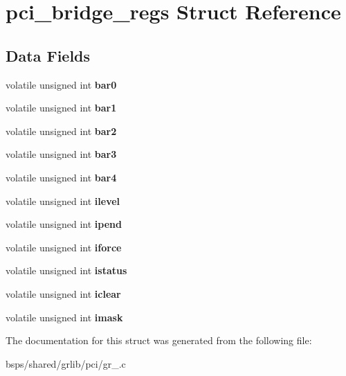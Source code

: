 \hypertarget{structpci__bridge__regs}{}\section{pci\+\_\+bridge\+\_\+regs Struct Reference}
\label{structpci__bridge__regs}
\subsection*{Data Fields}
\begin{DoxyCompactItemize}
\item 
\mbox{\label{structpci__bridge__regs_a6a49375f5d9adbc34e45adc59dcf5fa8}} 
volatile unsigned int {\bfseries bar0}
\item 
\mbox{\label{structpci__bridge__regs_ac6cdcee7ec727080a07e1de6ce5ab4d0}} 
volatile unsigned int {\bfseries bar1}
\item 
\mbox{\label{structpci__bridge__regs_a923411c8716ff44aa170d95dc853b584}} 
volatile unsigned int {\bfseries bar2}
\item 
\mbox{\label{structpci__bridge__regs_a6afb5873dcd731f9414df3502cbe85e6}} 
volatile unsigned int {\bfseries bar3}
\item 
\mbox{\label{structpci__bridge__regs_afe2f0bd2ee42304eb1a671c06c591055}} 
volatile unsigned int {\bfseries bar4}
\item 
\mbox{\label{structpci__bridge__regs_a25f20aeb3b38510a7496a5884d0a237f}} 
volatile unsigned int {\bfseries ilevel}
\item 
\mbox{\label{structpci__bridge__regs_aa2d592b0eab679f1e539b209b850fa48}} 
volatile unsigned int {\bfseries ipend}
\item 
\mbox{\label{structpci__bridge__regs_afdff9bcf097898242d4806d8d9e56638}} 
volatile unsigned int {\bfseries iforce}
\item 
\mbox{\label{structpci__bridge__regs_aa250a2864932e271dc1da6c7b571d510}} 
volatile unsigned int {\bfseries istatus}
\item 
\mbox{\label{structpci__bridge__regs_ad112eb1f3eddfe693f0b251774e537cb}} 
volatile unsigned int {\bfseries iclear}
\item 
\mbox{\label{structpci__bridge__regs_a1c1609bb51553ffad1d007aee326a0c9}} 
volatile unsigned int {\bfseries imask}
\end{DoxyCompactItemize}


The documentation for this struct was generated from the following file\+:\begin{DoxyCompactItemize}
\item 
bsps/shared/grlib/pci/gr\+\_.\+c\end{DoxyCompactItemize}
